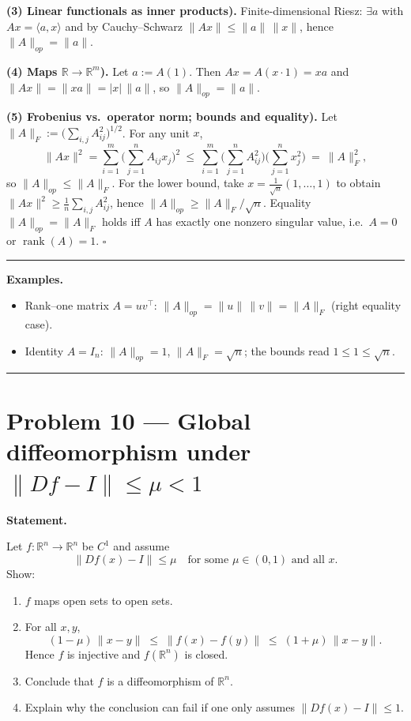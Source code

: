 \documentclass[12pt,a4paper]{article}
\theoremstyle{plain}
\theoremstyle{definition}
\theoremstyle{remark}
\theoremstyle{remark}
\newcommand{\gap}{\vspace{6pt}}
\begin{document}
\textbf{(3) Linear functionals as inner products).}\;
Finite-dimensional Riesz: $\exists a$ with $Ax=\langle a,x\rangle$ and by Cauchy–Schwarz
$\|Ax\|\le \|a\|\,\|x\|$, hence $\|A\|_{op}=\|a\|$.

\medskip

\textbf{(4) Maps $\mathbb{R}\to\mathbb{R}^m$).}\;
Let $a:=A(1)$. Then $Ax=A(x\cdot 1)=xa$ and
$\|Ax\|=\|x a\|=|x|\,\|a\|$, so $\|A\|_{op}=\|a\|$.

\medskip

\textbf{(5) Frobenius vs.\ operator norm; bounds and equality).}\;
Let $\|A\|_{F} := \big(\sum_{i,j} A_{ij}^2\big)^{1/2}$. For any unit $x$,
\[
\|Ax\|^2=\sum_{i=1}^{m}\Big(\sum_{j=1}^{n} A_{ij}x_j\Big)^2
\ \le\ \sum_{i=1}^{m}\Big(\sum_{j=1}^{n} A_{ij}^2\Big)\Big(\sum_{j=1}^{n}x_j^2\Big)
\ =\ \|A\|_F^2,
\]
so $\|A\|_{op}\le \|A\|_F$.
For the lower bound, take $x=\frac{1}{\sqrt{n}}(1,\dots,1)$ to obtain
$\|Ax\|^2\ge \tfrac{1}{n}\sum_{i,j}A_{ij}^2$, hence $\|A\|_{op}\ge \|A\|_F/\sqrt{n}$.
Equality $\|A\|_{op}=\|A\|_F$ holds iff $A$ has exactly one nonzero singular value,
i.e.\ $A=0$ or $\operatorname{rank}(A)=1$. \hfill$\square$

\bigskip\hrule\bigskip

\textbf{Examples.}\gap

\begin{itemize}\setlength{\itemsep}{6pt}
	\item Rank–one matrix $A=uv^\top$: $\|A\|_{op}=\|u\|\,\|v\|=\|A\|_F$ (right equality case).
	\item Identity $A=I_n$: $\|A\|_{op}=1$, $\|A\|_F=\sqrt{n}$; the bounds read
	$1\le 1 \le \sqrt{n}$.
\end{itemize}

\bigskip\hrule\bigskip


\section*{Problem 10 — Global diffeomorphism under $\|Df - I\| \le \mu < 1$}

\textbf{Statement.}\gap

Let $f:\mathbb{R}^n \to \mathbb{R}^n$ be $C^1$ and assume
\[
\|Df(x) - I\| \le \mu \quad \text{for some } \mu\in(0,1) \text{ and all } x.
\]
Show:
\begin{enumerate}\setlength{\itemsep}{6pt}
	\item $f$ maps open sets to open sets.
	\item For all $x,y$,
	\[
	(1-\mu)\,\|x-y\| \;\le\; \|f(x)-f(y)\| \;\le\; (1+\mu)\,\|x-y\|.
	\]
	Hence $f$ is injective and $f(\mathbb{R}^n)$ is closed.
	\item Conclude that $f$ is a diffeomorphism of $\mathbb{R}^n$.
	\item Explain why the conclusion can fail if one only assumes $\|Df(x)-I\|\le 1$.
\end{enumerate}
\end{document}

